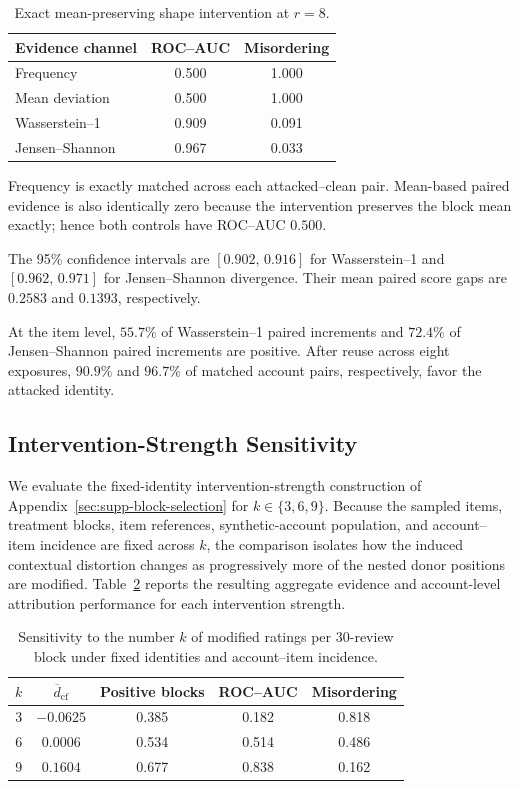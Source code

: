 \begin{table}[t]
\caption{Exact mean-preserving shape intervention at $r=8$.}
\label{tab:supp-shape-results}
\centering
\small
\begin{tabular}{@{}lcc@{}}
\toprule
Evidence channel & ROC--AUC & Misordering \\
\midrule
Frequency & 0.500 & 1.000 \\
Mean deviation & 0.500 & 1.000 \\
Wasserstein--1 & 0.909 & 0.091 \\
Jensen--Shannon & 0.967 & 0.033 \\
\bottomrule
\end{tabular}
\end{table}

Frequency is exactly matched across each attacked--clean pair. Mean-based
paired evidence is also identically zero because the intervention preserves
the block mean exactly; hence both controls have ROC--AUC $0.500$.

The 95\% confidence intervals are $[0.902,\,0.916]$ for Wasserstein--1 and
$[0.962,\,0.971]$ for Jensen--Shannon divergence. Their mean paired score
gaps are $0.2583$ and $0.1393$, respectively.

At the item level, $55.7\%$ of Wasserstein--1 paired increments and $72.4\%$
of Jensen--Shannon paired increments are positive. After reuse across eight
exposures, $90.9\%$ and $96.7\%$ of matched account pairs, respectively,
favor the attacked identity.

\subsection{Intervention-Strength Sensitivity}
\label{sec:supp-intervention-strength}

We evaluate the fixed-identity intervention-strength construction of
Appendix~\ref{sec:supp-block-selection} for $k\in\{3,6,9\}$. Because the
sampled items, treatment
blocks, item references, synthetic-account population, and account--item
incidence are fixed across $k$, the comparison isolates how the induced
contextual distortion changes as progressively more of the nested donor
positions are modified. Table~\ref{tab:supp-strength-results} reports the
resulting aggregate evidence and account-level attribution performance for
each intervention strength.

\begin{table}[t]
\caption{Sensitivity to the number $k$ of modified ratings per 30-review
block under fixed identities and account--item incidence.}
\label{tab:supp-strength-results}
\centering
\small
\begin{tabular}{@{}ccccc@{}}
\toprule
$k$
& $\overline d_{\mathrm{cf}}$
& Positive blocks
& ROC--AUC
& Misordering \\
\midrule
3 & $-0.0625$ & 0.385 & 0.182 & 0.818 \\
6 & $ 0.0006$ & 0.534 & 0.514 & 0.486 \\
9 & $ 0.1604$ & 0.677 & 0.838 & 0.162 \\
\bottomrule
\end{tabular}
\end{table}


